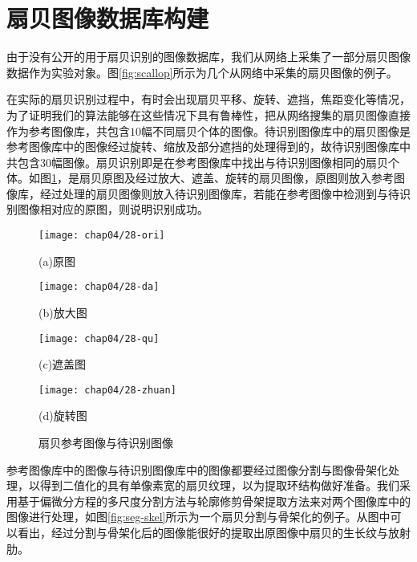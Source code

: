\section{扇贝图像数据库构建}
\label{}
由于没有公开的用于扇贝识别的图像数据库，我们从网络上采集了一部分扇贝图像数据作为实验对象。图\ref{fig:scallop}所示为几个从网络中采集的扇贝图像的例子。

在实际的扇贝识别过程中，有时会出现扇贝平移、旋转、遮挡，焦距变化等情况，为了证明我们的算法能够在这些情况下具有鲁棒性，把从网络搜集的扇贝图像直接作为参考图像库，共包含$10$幅不同扇贝个体的图像。待识别图像库中的扇贝图像是参考图像库中的图像经过旋转、缩放及部分遮挡的处理得到的，故待识别图像库中共包含$30$幅图像。扇贝识别即是在参考图像库中找出与待识别图像相同的扇贝个体。如图\ref{fig:process}，是扇贝原图及经过放大、遮盖、旋转的扇贝图像，原图则放入参考图像库，经过处理的扇贝图像则放入待识别图像库，若能在参考图像中检测到与待识别图像相对应的原图，则说明识别成功。

\begin{figure}
\centering
  \begin{minipage}[b]{0.48\textwidth} 
      \centering 
      \texttt{[image: chap04/28-ori]}
        \centerline{(a)原图}\medskip
    \end{minipage}
  \begin{minipage}[b]{0.48\textwidth}
    \centering
    \texttt{[image: chap04/28-da]}
      \centerline{(b)放大图}\medskip
    \end{minipage}
  \begin{minipage}[b]{0.48\textwidth} 
      \centering 
      \texttt{[image: chap04/28-qu]}
        \centerline{(c)遮盖图}\medskip
    \end{minipage}
  \begin{minipage}[b]{0.48\textwidth}
    \centering
    \texttt{[image: chap04/28-zhuan]}
      \centerline{(d)旋转图}\medskip
  \end{minipage}
\caption{扇贝参考图像与待识别图像}
\label{fig:process}
\end{figure}

参考图像库中的图像与待识别图像库中的图像都要经过图像分割与图像骨架化处理，以得到二值化的具有单像素宽的扇贝纹理，以为提取环结构做好准备。我们采用基于偏微分方程的多尺度分割方法与轮廓修剪骨架提取方法来对两个图像库中的图像进行处理，如图\ref{fig:seg-skel}所示为一个扇贝分割与骨架化的例子。从图中可以看出，经过分割与骨架化后的图像能很好的提取出原图像中扇贝的生长纹与放射肋。

